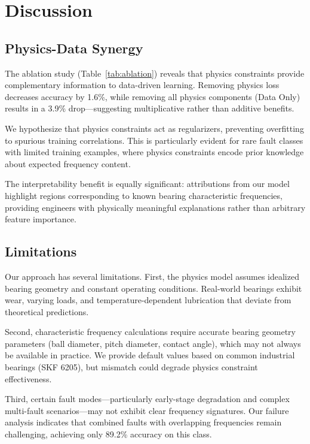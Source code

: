 \documentclass[journal]{IEEEtran}
\begin{document}
\section{Discussion}
\label{sec:discussion}

\subsection{Physics-Data Synergy}

The ablation study (Table~\ref{tab:ablation}) reveals that physics constraints
provide complementary information to data-driven learning. Removing physics
loss decreases accuracy by 1.6\%, while removing all physics components
(Data Only) results in a 3.9\% drop—suggesting multiplicative rather than
additive benefits.

We hypothesize that physics constraints act as regularizers, preventing
overfitting to spurious training correlations. This is particularly evident
for rare fault classes with limited training examples, where physics
constraints encode prior knowledge about expected frequency content.

The interpretability benefit is equally significant: attributions from our
model highlight regions corresponding to known bearing characteristic
frequencies, providing engineers with physically meaningful explanations
rather than arbitrary feature importance.

\subsection{Limitations}

Our approach has several limitations. First, the physics model assumes
idealized bearing geometry and constant operating conditions. Real-world
bearings exhibit wear, varying loads, and temperature-dependent lubrication
that deviate from theoretical predictions.

Second, characteristic frequency calculations require accurate bearing
geometry parameters (ball diameter, pitch diameter, contact angle), which
may not always be available in practice. We provide default values based
on common industrial bearings (SKF 6205), but mismatch could degrade
physics constraint effectiveness.

Third, certain fault modes—particularly early-stage degradation and complex
multi-fault scenarios—may not exhibit clear frequency signatures. Our
failure analysis indicates that combined faults with overlapping frequencies
remain challenging, achieving only 89.2\% accuracy on this class.
\end{document}
